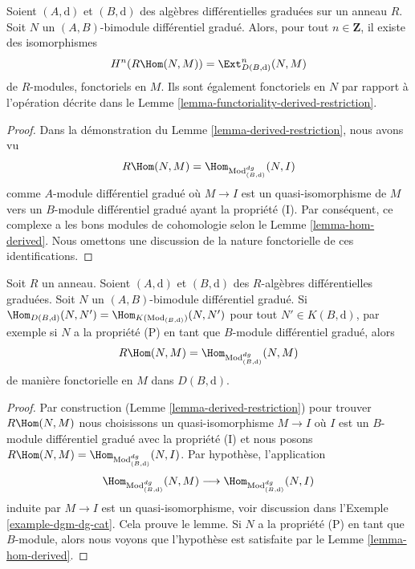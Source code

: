 \begin{lemma}
\label{lemma-derived-restriction-exts}
Soient $(A, \text{d})$ et $(B, \text{d})$ des algèbres différentielles graduées
sur un anneau $R$. Soit $N$ un $(A, B)$-bimodule différentiel gradué. Alors, pour
tout $n \in \mathbf{Z}$, il existe des isomorphismes
$$
H^n(R\Hom(N, M)) = \Ext^n_{D(B, \text{d})}(N, M)
$$
de $R$-modules, fonctoriels en $M$. Ils sont également fonctoriels en $N$ par rapport
à l'opération décrite dans le Lemme \ref{lemma-functoriality-derived-restriction}.
\end{lemma}

\begin{proof}
Dans la démonstration du Lemme \ref{lemma-derived-restriction}, nous avons vu
$$
R\Hom(N, M) = 
\Hom_{\text{Mod}^{dg}_{(B, \text{d})}}(N, I)
$$
comme $A$-module différentiel gradué où $M \to I$ est un quasi-isomorphisme
de $M$ vers un $B$-module différentiel gradué ayant la propriété (I). Par
conséquent, ce complexe a les bons modules de cohomologie selon le Lemme
\ref{lemma-hom-derived}. Nous omettons une discussion de la nature fonctorielle de
ces identifications.
\end{proof}

\begin{lemma}
\label{lemma-compute-derived-restriction}
Soit $R$ un anneau. Soient $(A, \text{d})$ et $(B, \text{d})$ des $R$-algèbres
différentielles graduées. Soit $N$ un $(A, B)$-bimodule différentiel gradué. Si
$\Hom_{D(B, \text{d})}(N, N') = \Hom_{K(\text{Mod}_{(B, \text{d})})}(N, N')$ pour
tout $N' \in K(B, \text{d})$, par exemple si $N$ a la propriété (P) en tant que
$B$-module différentiel gradué, alors
$$
R\Hom(N, M) = \Hom_{\text{Mod}^{dg}_{(B, \text{d})}}(N, M)
$$
de manière fonctorielle en $M$ dans $D(B, \text{d})$.
\end{lemma}

\begin{proof}
Par construction (Lemme \ref{lemma-derived-restriction}) pour trouver $R\Hom(N,
M)$ nous choisissons un quasi-isomorphisme $M \to I$ où $I$ est un $B$-module
différentiel gradué avec la propriété (I) et nous posons $R\Hom(N, M) =
\Hom_{\text{Mod}^{dg}_{(B, \text{d})}}(N, I)$. Par hypothèse, l'application
$$
\Hom_{\text{Mod}^{dg}_{(B, \text{d})}}(N, M) \longrightarrow
\Hom_{\text{Mod}^{dg}_{(B, \text{d})}}(N, I)
$$
induite par $M \to I$ est un quasi-isomorphisme, voir discussion dans l'Exemple
\ref{example-dgm-dg-cat}. Cela prouve le lemme. Si $N$ a la propriété (P) en tant
que $B$-module, alors nous voyons que l'hypothèse est satisfaite par le Lemme
\ref{lemma-hom-derived}.
\end{proof}




